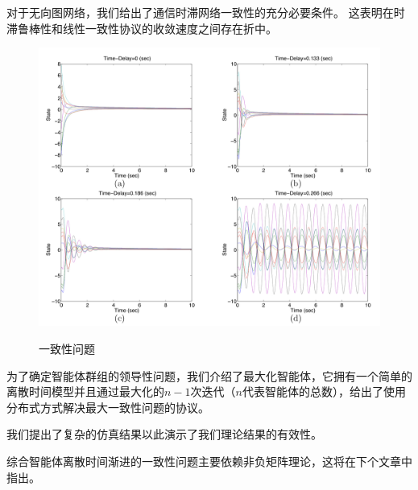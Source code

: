 \documentclass{article}
\begin{document}
对于无向图网络，我们给出了通信时滞网络一致性的充分必要条件。
这表明在时滞鲁棒性和线性一致性协议的收敛速度之间存在折中。
\begin{figure}[htbp]
    \centering
    \includegraphics[width=14.5cm]{figures/Fig8-ConsensusProblem.jpeg}
    \label{ConsensusProblem}
    \caption{一致性问题}
\end{figure}

为了确定智能体群组的领导性问题，我们介绍了最大化智能体，它拥有一个简单的离散时间模型并且通过最大化的$n-1$次迭代（$n$代表智能体的总数），给出了使用分布式方式解决最大一致性问题的协议。

我们提出了复杂的仿真结果以此演示了我们理论结果的有效性。

综合智能体离散时间渐进的一致性问题主要依赖非负矩阵理论，这将在下个文章中指出。
\end{document}
